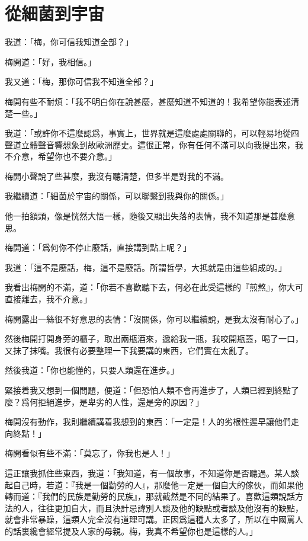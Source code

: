 \chapter{從細菌到宇宙}
我道：「梅，你可信我知道全部？」

梅開道：「好，我相信。」

我又道：「梅，那你可信我不知道全部？」

梅開有些不耐煩：「我不明白你在說甚麼，甚麼知道不知道的！我希望你能表述清楚一些。」

我道：「或許你不這麼認爲，事實上，世界就是這麼處處關聯的，可以輕易地從四聲道立體聲音響想象到故歐洲歷史。這很正常，你有任何不滿可以向我提出來，我不介意，希望你也不要介意。」

梅開小聲說了些甚麼，我沒有聽清楚，但多半是對我的不滿。

我繼續道：「細菌於宇宙的關係，可以聯繫到我與你的關係。」

他一拍額頭，像是恍然大悟一樣，隨後又顯出失落的表情，我不知道那是甚麼意思。

梅開道：「爲何你不停止廢話，直接講到點上呢？」

我道：「這不是廢話，梅，這不是廢話。所謂哲學，大抵就是由這些組成的。」

我看出梅開的不滿，道：「你若不喜歡聽下去，何必在此受這樣的『煎熬』，你大可直接離去，我不介意。」

梅開露出一絲很不好意思的表情：「沒關係，你可以繼續說，是我太沒有耐心了。」

然後梅開打開身旁的櫃子，取出兩瓶酒來，遞給我一瓶，我咬開瓶蓋，喝了一口，又抹了抹嘴。我很有必要整理一下我要講的東西，它們實在太亂了。

然後我道：「你也能懂的，只要人類還在進步。」

緊接着我又想到一個問題，便道：「但恐怕人類不會再進步了，人類已經到終點了麼？爲何拒絕進步，是卑劣的人性，還是旁的原因？」

梅開沒有動作，我則繼續講着我想到的東西：「一定是！人的劣根性遲早讓他們走向終點！」

梅開看似有些不滿：「莫忘了，你我也是人！」

這正讓我抓住些東西，我道：「我知道，有一個故事，不知道你是否聽過。某人談起自己時，若道：『我是一個勤勞的人』，那麼他一定是一個自大的傢伙，而如果他轉而道：『我們的民族是勤勞的民族』，那就截然是不同的結果了。喜歡這類說話方法的人，往往更加自大，而且決計忌諱別人談及他的缺點或者談及他沒有的缺點，就會非常暴躁，這類人完全沒有道理可講。正因爲這種人太多了，所以在中國罵人的話裏纔會經常提及人家的母親。梅，我真不希望你也是這樣的人。」

